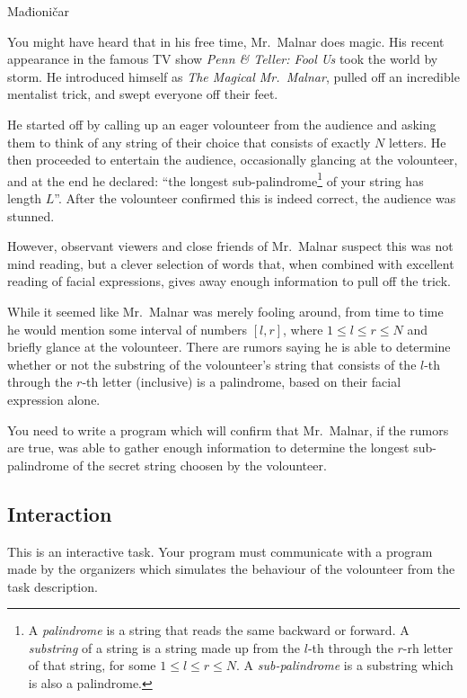 \begin{statement}[
  problempoints=100,
  timelimit=5 seconds,
  memorylimit=512 MiB,
]{Mađioničar}

You might have heard that in his free time, Mr.\ Malnar does magic. 
His recent appearance in the famous TV show
\textit{Penn \& Teller: Fool Us} took the world by storm.
He introduced himself as
\textit{The Magical Mr.\ Malnar},
pulled off an incredible mentalist trick, 
and swept everyone off their feet.

He started off by calling up an eager volounteer from the audience and 
asking them to think of any string of their choice that consists of exactly $N$ letters.
He then proceeded to entertain the audience, occasionally glancing at the volounteer,
and at the end he declared: ``the longest sub-palindrome\footnote{
A \textit{palindrome} is a string that reads the same backward or forward.
A \textit{substring} of a string is a string made up from the $l$-th through the $r$-rh letter of that string, for some
$1 \leq l \leq r \leq N$. A \textit{sub-palindrome} is a substring which is also a palindrome.
} of your string has length $L$''.
After the volounteer confirmed this is indeed correct, the audience was stunned.

However, observant viewers and close friends of Mr.\ Malnar suspect this was not
mind reading, but a clever selection of words that, when combined with excellent
reading of facial expressions, gives away enough information to pull off the trick. 

While it seemed like Mr.\ Malnar was merely fooling around, from time to time
he would mention some interval of numbers $[l, r]$, where $1 \leq l \leq r \leq N$
and briefly glance at the volounteer. There are rumors saying he is able to determine
whether or not the substring of the volounteer's string that consists of
the $l$-th through the $r$-th letter (inclusive) is a palindrome, based on their facial
expression alone.

You need to write a program which will confirm that Mr.\ Malnar, if the rumors are true,
was able to gather enough information to determine the longest sub-palindrome of the
secret string choosen by the volounteer.

\subsection*{Interaction}
This is an interactive task. Your program must communicate with a program made
by the organizers which simulates the behaviour of the volounteer
from the task description.


\end{statement}
